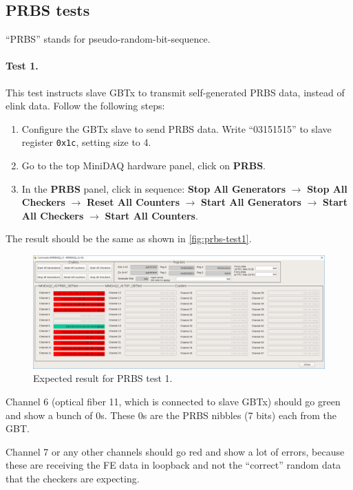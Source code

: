 \subsection{PRBS tests}
``PRBS'' stands for pseudo-random-bit-sequence.

\paragraph{Test 1.}
This test instructs slave GBTx to transmit self-generated PRBS data, instead of
elink data.
Follow the following steps:
\begin{enumerate}
    \item Configure the GBTx slave to send PRBS data. Write ``03151515'' to
        slave register \texttt{0x1c}, setting size to 4.
    \item Go to the top MiniDAQ hardware panel, click on \textbf{PRBS}.
    \item In the \textbf{PRBS} panel, click in sequence:
        \textbf{Stop All Generators} $\to$ \textbf{Stop All Checkers} $\to$ 
        \textbf{Reset All Counters} $\to$
        \textbf{Start All Generators} $\to$ \textbf{Start All Checkers} $\to$
        \textbf{Start All Counters}.
\end{enumerate}

The result should be the same as shown in \autoref{fig:prbs-test1}.

\begin{figure}[ht]
    \centering
    \includegraphics[width=\textwidth]{res/prbs_test1.png}
    \caption{Expected result for PRBS test 1.}
    \label{fig:prbs-test1}
\end{figure}

\begin{leftbar}
    Channel 6 (optical fiber 11, which is connected to slave GBTx) should go
    green and show a bunch of 0s.
    These 0s are the PRBS nibbles (7 bits) each from the GBT.
\end{leftbar}

\begin{leftbar}
    Channel 7 or any other channels should go red and show a lot of errors,
    because these are receiving the FE data in loopback and not the ``correct''
    random data that the checkers are expecting.
\end{leftbar}


